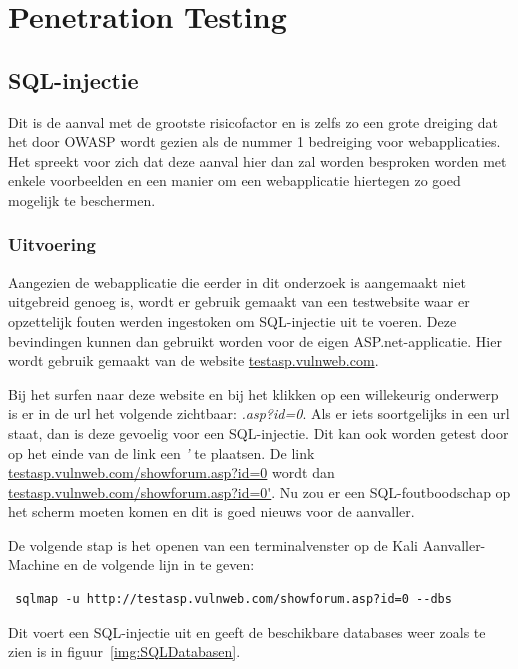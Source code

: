 \documentclass[pdftex,a4paper,12pt]{report}
\begin{document}
\chapter{Penetration Testing}

\section{SQL-injectie}
Dit is de aanval met de grootste risicofactor en is zelfs zo een grote dreiging dat het door OWASP wordt gezien als de nummer 1 bedreiging voor webapplicaties. Het spreekt voor zich dat deze aanval hier dan zal worden besproken worden met enkele voorbeelden en een manier om een webapplicatie hiertegen zo goed mogelijk te beschermen.

\subsection{Uitvoering}
Aangezien de webapplicatie die eerder in dit onderzoek is aangemaakt niet uitgebreid genoeg is, wordt er gebruik gemaakt van een testwebsite waar er opzettelijk fouten werden ingestoken om SQL-injectie uit te voeren. Deze bevindingen kunnen dan gebruikt worden voor de eigen ASP.net-applicatie. Hier wordt gebruik gemaakt van de website \url{testasp.vulnweb.com}. \newline

Bij het surfen naar deze website en bij het klikken op een willekeurig onderwerp is er in de url het volgende zichtbaar: \textit{.asp?id=0}. Als er iets soortgelijks in een url staat, dan is deze gevoelig voor een SQL-injectie. Dit kan ook worden getest door op het einde van de link een \textit{'} te plaatsen. De link \url{testasp.vulnweb.com/showforum.asp?id=0} wordt dan \url{testasp.vulnweb.com/showforum.asp?id=0'}. Nu zou er een SQL-foutboodschap op het scherm moeten komen en dit is goed nieuws voor de aanvaller. \newline

De volgende stap is het openen van een terminalvenster op de Kali Aanvaller-Machine en de volgende lijn in te geven:
\begin{verbatim} sqlmap -u http://testasp.vulnweb.com/showforum.asp?id=0 --dbs \end{verbatim}
Dit voert een SQL-injectie uit en geeft de beschikbare databases weer zoals te zien is in figuur~\ref{img:SQLDatabasen}. 
\end{document}
